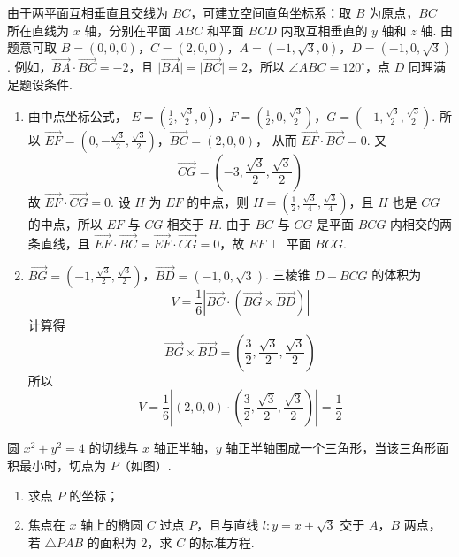 \begin{solution}
由于两平面互相垂直且交线为 \(BC\)，可建立空间直角坐标系：取 \(B\) 为原点，\(BC\) 所在直线为 \(x\) 轴，分别在平面 \(ABC\) 和平面 \(BCD\) 内取互相垂直的 \(y\) 轴和 \(z\) 轴. 由题意可取
\(B=(0,0,0)\)，\(C=(2,0,0)\)，\(A=(-1,\sqrt{3},0)\)，\(D=(-1,0,\sqrt{3})\).
例如，\(\overrightarrow{BA}\cdot\overrightarrow{BC}=-2\)，且 \(\lvert\overrightarrow{BA}\rvert=\lvert\overrightarrow{BC}\rvert=2\)，所以 \(\angle ABC=120^{\circ}\)，点 \(D\) 同理满足题设条件.
\begin{enumerate}
\item 由中点坐标公式，
\(E=\left(\frac{1}{2},\frac{\sqrt{3}}{2},0\right)\)，\(F=\left(\frac{1}{2},0,\frac{\sqrt{3}}{2}\right)\)，\(G=\left(-1,\frac{\sqrt{3}}{2},\frac{\sqrt{3}}{2}\right)\).
所以
\(\overrightarrow{EF}=\left(0,-\frac{\sqrt{3}}{2},\frac{\sqrt{3}}{2}\right)\)，\(\overrightarrow{BC}=(2,0,0)\)，
从而 \(\overrightarrow{EF}\cdot\overrightarrow{BC}=0\). 又
\[
\overrightarrow{CG}=\left(-3,\frac{\sqrt{3}}{2},\frac{\sqrt{3}}{2}\right)
\]
故 \(\overrightarrow{EF}\cdot\overrightarrow{CG}=0\). 设 \(H\) 为 \(EF\) 的中点，则
\(H=\left(\frac{1}{2},\frac{\sqrt{3}}{4},\frac{\sqrt{3}}{4}\right)\)，且 \(H\) 也是 \(CG\) 的中点，所以 \(EF\) 与 \(CG\) 相交于 \(H\). 由于 \(BC\) 与 \(CG\) 是平面 \(BCG\) 内相交的两条直线，且
\(\overrightarrow{EF}\cdot\overrightarrow{BC}=\overrightarrow{EF}\cdot\overrightarrow{CG}=0\)，故 \(EF\perp\) 平面 \(BCG\).
\item
\(\overrightarrow{BG}=\left(-1,\frac{\sqrt{3}}{2},\frac{\sqrt{3}}{2}\right)\)，\(\overrightarrow{BD}=(-1,0,\sqrt{3})\).
三棱锥 \(D-BCG\) 的体积为
\[
V=\frac{1}{6}\left|\overrightarrow{BC}\cdot\left(\overrightarrow{BG}\times\overrightarrow{BD}\right)\right|
\]
计算得
\[
\overrightarrow{BG}\times\overrightarrow{BD}=\left(\frac{3}{2},\frac{\sqrt{3}}{2},\frac{\sqrt{3}}{2}\right)
\]
所以
\[
V=\frac{1}{6}\left|(2,0,0)\cdot\left(\frac{3}{2},\frac{\sqrt{3}}{2},\frac{\sqrt{3}}{2}\right)\right|=\frac{1}{2}
\]
\end{enumerate}
\end{solution}

\begin{problem}
圆 \(x^{2} + y^{2} = 4\) 的切线与 \(x\) 轴正半轴，\(y\) 轴正半轴围成一个三角形，当该三角形面积最小时，切点为 \(P\)（如图）.
\begin{enumerate}
\item 求点 \(P\) 的坐标；
\item 焦点在 \(x\) 轴上的椭圆 \(C\) 过点 \(P\)，且与直线 \(l: y = x + \sqrt{3}\) 交于 \(A\)，\(B\) 两点，若 \(\triangle PAB\) 的面积为 \(2\)，求 \(C\) 的标准方程.
\end{enumerate}

\end{problem}


